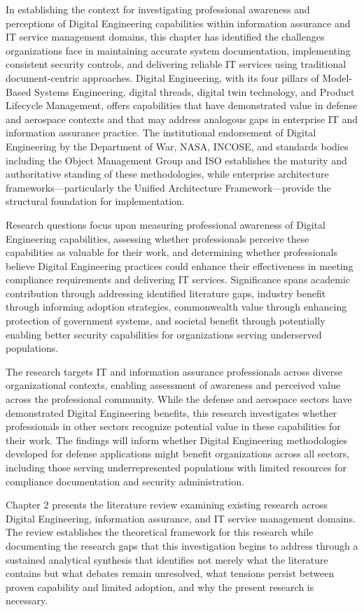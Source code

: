 In establishing the context for investigating professional awareness and perceptions of Digital Engineering capabilities within information assurance and IT service management domains, this chapter has identified the challenges organizations face in maintaining accurate system documentation, implementing consistent security controls, and delivering reliable IT services using traditional document-centric approaches. Digital Engineering, with its four pillars of Model-Based Systems Engineering, digital threads, digital twin technology, and Product Lifecycle Management, offers capabilities that have demonstrated value in defense and aerospace contexts and that may address analogous gaps in enterprise IT and information assurance practice. The institutional endorsement of Digital Engineering by the Department of War, NASA, INCOSE, and standards bodies including the Object Management Group and ISO establishes the maturity and authoritative standing of these methodologies, while enterprise architecture frameworks---particularly the Unified Architecture Framework---provide the structural foundation for implementation.

Research questions focus upon measuring professional awareness of Digital Engineering capabilities, assessing whether professionals perceive these capabilities as valuable for their work, and determining whether professionals believe Digital Engineering practices could enhance their effectiveness in meeting compliance requirements and delivering IT services. Significance spans academic contribution through addressing identified literature gaps, industry benefit through informing adoption strategies, commonwealth value through enhancing protection of government systems, and societal benefit through potentially enabling better security capabilities for organizations serving underserved populations.

The research targets IT and information assurance professionals across diverse organizational contexts, enabling assessment of awareness and perceived value across the professional community. While the defense and aerospace sectors have demonstrated Digital Engineering benefits, this research investigates whether professionals in other sectors recognize potential value in these capabilities for their work. The findings will inform whether Digital Engineering methodologies developed for defense applications might benefit organizations across all sectors, including those serving underrepresented populations with limited resources for compliance documentation and security administration.

Chapter 2 presents the literature review examining existing research across Digital Engineering, information assurance, and IT service management domains. The review establishes the theoretical framework for this research while documenting the research gaps that this investigation begins to address through a sustained analytical synthesis that identifies not merely what the literature contains but what debates remain unresolved, what tensions persist between proven capability and limited adoption, and why the present research is necessary.